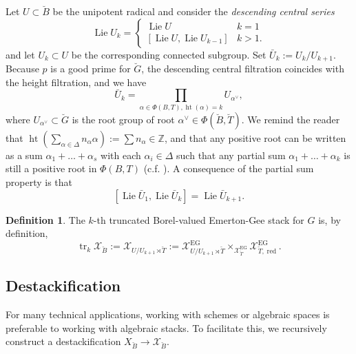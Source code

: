 \documentclass[11pt]{amsart}
\newcommand{\MINOREDITED}[1]{#1}
\theoremstyle{definition}
\newtheorem{defn}[thm]{Definition}
\newcommand{\Z}{\mathbb{Z}}
\newcommand{\cX}{\mathcal{X}}
\newcommand{\bG}{\breve{G}}
\newcommand{\bB}{\breve{B}}
\newcommand{\bT}{\breve{T}}
\DeclareMathOperator{\EG}{EG}
\DeclareMathOperator{\Ht}{ht}
\DeclareMathOperator{\Lie}{Lie}
\DeclareMathOperator{\tr}{tr}
\DeclareMathOperator{\red}{red}
\begin{document}
Let $U\subset \bB$ be the unipotent radical
and consider the {\it  descending central series}
\[
\Lie U_k = 
\begin{cases}
\Lie U & k=1 \\
[\Lie U,\Lie U_{k-1}] & k>1.
\end{cases}
\]
\MINOREDITED{and let $U_k\subset U$ be the corresponding connected subgroup.}
Set $\bar U_k:= U_{k}/U_{k+1}$.
Because $p$ is a good prime for $\bG$,
the descending central filtration coincides with the height filtration, and we have
\[
\bar U_k= \prod_{\alpha\in \Phi(B,T), \Ht(\alpha)=k} U_{\alpha^{\!\!\vee}},
\]
where $U_{\alpha^{\!\!\vee}} \subset \bG$
is the root group of root $\alpha^{\!\!\vee}
\in 
\MINOREDITED{\Phi(\bB,\bT)}$.
We remind the reader that $\Ht(\sum_{\alpha\in \Delta}n_\alpha \alpha)
:=\sum n_\alpha\in \Z$,
and that any positive root can be written as a sum
$\alpha_1+\dots+\alpha_s$ with each $\alpha_i\in \Delta$
such that any partial sum 
\MINOREDITED{$\alpha_1+\dots+\alpha_k$}
is still a positive root in $\Phi(B,T)$
(c.f. \cite[Lemma 10.2.B]{Hum72}).
A consequence of the partial sum property is that
\begin{equation}
\label{eq:PSP}
[\Lie \bar U_1,\Lie \bar U_k] = \Lie\bar U_{k+1}.
\end{equation}

\begin{defn}
The $k$-th truncated Borel-valued Emerton-Gee
stack for $G$ is, by definition,
\[
\tr_k\cX_{\bB}:=\cX_{U/U_{k+1} \rtimes \bT}
:=
\cX_{U/U_{k+1} \rtimes \bT}^{\EG}
\times_{\cX_{\bT}^{\EG}} \cX_{\bT,\red}^{\EG}
.
\]
\end{defn}

\subsection{Destackification}
\label{subsec:Borel-destack}
For many technical applications, working with schemes or algebraic spaces is preferable to working with algebraic stacks. 
To facilitate this, we recursively construct a destackification 
$X_{\bB}\to \cX_{\bB}$. 
\end{document}
